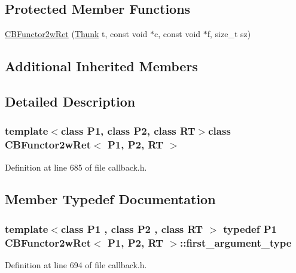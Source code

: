 \subsection*{Protected Member Functions}
\begin{DoxyCompactItemize}
\item 
\hyperlink{class_c_b_functor2w_ret_acf220825a2caa6ce6db82f537244ed65}{C\+B\+Functor2w\+Ret} (\hyperlink{class_c_b_functor2w_ret_a550afb1fd40c4dd859c80dfaa830e3aa}{Thunk} t, const void $\ast$c, const void $\ast$f, size\+\_\+t sz)
\end{DoxyCompactItemize}
\subsection*{Additional Inherited Members}


\subsection{Detailed Description}
\subsubsection*{template$<$class P1, class P2, class R\+T$>$class C\+B\+Functor2w\+Ret$<$ P1, P2, R\+T $>$}



Definition at line 685 of file callback.\+h.



\subsection{Member Typedef Documentation}
\hypertarget{class_c_b_functor2w_ret_a7d24bfcc6aa65aa4b55b5e959a004dd4}{
\subsubsection[{first\+\_\+argument\+\_\+type}]{\setlength{\rightskip}{0pt plus 5cm}template$<$class P1 , class P2 , class R\+T $>$ typedef P1 {\bf C\+B\+Functor2w\+Ret}$<$ P1, P2, R\+T $>$\+::{\bf first\+\_\+argument\+\_\+type}}}\label{class_c_b_functor2w_ret_a7d24bfcc6aa65aa4b55b5e959a004dd4}


Definition at line 694 of file callback.\+h.

